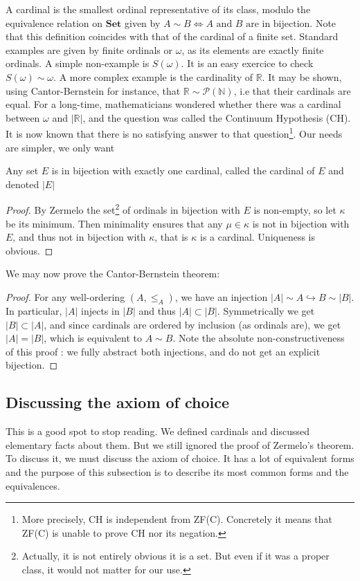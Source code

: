 \documentclass{article}
\begin{document}
A cardinal is the smallest ordinal representative of its class, modulo the equivalence relation on $\mathbf{Set}$ given by $A \sim B \iff A\text{ and } B \text{ are in bijection}$. Note that this definition coincides with that of the cardinal of a finite set. Standard examples are given by finite ordinals or $\omega$, as its elements are exactly finite ordinals. A simple non-example is $S(\omega)$. It is an easy exercice to check $S(\omega) \sim \omega$. A more complex example is the cardinality of $\mathbb{R}$. It may be shown, using Cantor-Bernstein for instance, that $\mathbb{R} \sim \mathcal{P}(\mathbb{N})$, i.e that their cardinals are equal. For a long-time, mathematicians wondered whether there was a cardinal between $\omega$ and $|\mathbb{R}|$, and the question was called the Continuum Hypothesis (CH). It is now known that there is no satisfying answer to that question\footnote{More precisely, CH is independent from ZF(C). Concretely it means that ZF(C) is unable to prove CH nor its negation.}. Our needs are simpler, we only want
\begin{theorem}[ZFC]
    Any set $E$ is in bijection with exactly one cardinal, called the cardinal of $E$ and denoted $|E|$
\end{theorem}

\begin{proof}
    By Zermelo the set\footnote{Actually, it is not entirely obvious it is a set. But even if it was a proper class, it would not matter for our use.} of ordinals in bijection with $E$ is non-empty, so let $\kappa$ be its minimum. Then minimality ensures that any $\mu \in \kappa$ is not in bijection with $E$, and thus not in bijection with $\kappa$, that is $\kappa$ is a cardinal. Uniqueness is obvious.
\end{proof}

We may now prove the Cantor-Bernstein theorem: \begin{proof}
    For any well-ordering $(A, \leq_A)$, we have an injection $|A| \sim A \hookrightarrow B \sim |B|$. In particular, $|A|$ injects in $|B|$ and thus $|A| \subset |B|$. Symmetrically we get $|B| \subset |A|$, and since cardinals are ordered by inclusion (as ordinals are), we get $|A| = |B|$, which is equivalent to $A \sim B$. Note the absolute non-constructiveness of this proof : we fully abstract both injections, and do not get an explicit bijection. 
\end{proof}

\subsection{Discussing the axiom of choice}
This is a good spot to stop reading. We defined cardinals and discussed elementary facts about them. But we still ignored the proof of Zermelo's theorem. To discuss it, we must discuss the axiom of choice. It has a lot of equivalent forms and the purpose of this subsection is to describe its most common forms and the equivalences.
\end{document}
